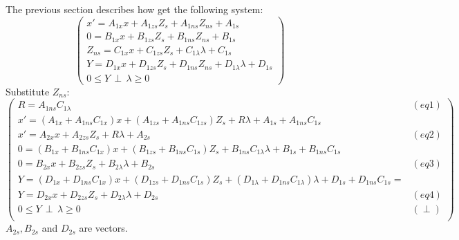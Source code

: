 The previous section describes how get the following system:
\[\left(\begin{array}{c}
x'=A_{1x}x +A_{1zs}Z_{s} + A_{1ns}Z_{ns}+A_{1s}\\
0=B_{1x}x+B_{1zs}Z_{s} + B_{1ns}Z_{ns}+B_{1s}\\
Z_{ns}= C_{1x}x+C_{1zs}Z_{s}+C_{1\lambda}\lambda +C_{1s}\\
Y=D_{1x}x +D_{1zs}Z_{s}+D_{1ns}Z_{ns}+D_{1\lambda}\lambda+D_{1s}\\
0 \leq Y \, \perp \, \lambda \geq 0
\end{array}\right)\]
Substitute $Z_{ns}$:
\[\left(\begin{array}{cc}
R=A_{1ns}C_{1\lambda}&(eq1)\\
x'=(A_{1x}+A_{1ns}C_{1x})x +(A_{1zs}+A_{1ns}C_{1zs})Z_{s} +R\lambda+A_{1s} + A_{1ns}C_{1s}\\
x'=A_{2x}x +A_{2zs}Z_{s} +R \lambda +A_{2s}&(eq2)\\
0=(B_{1x}+B_{1ns}C_{1x})x+(B_{1zs}+B_{1ns}C_{1s})Z_{s} + B_{1ns}C_{1\lambda}\lambda +B_{1s} + B_{1ns}C_{1s} \\
0=B_{2x}x+B_{2zs}Z_{s} + B_{2\lambda}\lambda + B_{2s}&(eq3)\\
Y=(D_{1x}+D_{1ns}C_{1x})x+(D_{1zs}+D_{1ns}C_{1s})Z_{s}+(D_{1\lambda}+D_{1ns}C_{1\lambda})\lambda +D_{1s}+D_{1ns}C_{1s}=\\
Y=D_{2x}x+D_{2zs}Z_{s}+D_{2\lambda}\lambda + D_{2s} &(eq4)\\
0 \leq Y \, \perp \, \lambda \geq 0&(\perp)\\
\end{array}\right)\]
$A_{2s}, B_{2s}$ and $D_{2s}$ are vectors.



